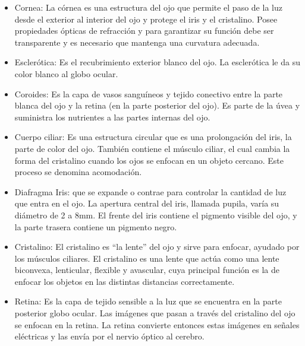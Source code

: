 \begin{itemize}
	\item Cornea: La córnea es una estructura del ojo que permite el paso de la luz
	      desde el exterior al interior del ojo y protege el iris y el cristalino. Posee
	      propiedades ópticas de refracción y para garantizar su función debe ser transparente
	      y es necesario que mantenga una curvatura adecuada.
	\item Esclerótica: Es el recubrimiento exterior blanco del ojo. La esclerótica le da
	      su color blanco al globo ocular.
	\item Coroides: Es la capa de vasos sanguíneos y tejido conectivo entre la parte blanca del ojo y la retina (en la parte posterior del ojo). Es parte de la úvea y suministra los nutrientes a las partes internas del ojo.
	\item Cuerpo ciliar: Es una estructura circular que es una prolongación del iris, la
	      parte de color del ojo. También contiene el músculo ciliar, el cual cambia la forma
	      del cristalino cuando los ojos se enfocan en un objeto cercano. Este proceso se
	      denomina acomodación.
	\item Diafragma Iris: que se expande o contrae para controlar la cantidad de luz que
	      entra en el ojo. La apertura central del iris, llamada pupila, varía su diámetro de 2
	      a 8mm. El frente del iris contiene el pigmento visible del ojo, y la parte trasera
	      contiene un pigmento negro.
	\item Cristalino: El cristalino es “la lente” del ojo y sirve para enfocar, ayudado
	      por los músculos ciliares. El cristalino es una lente que actúa como una lente
	      biconvexa, lenticular, flexible y avascular, cuya principal función es la de enfocar
	      los objetos en las distintas distancias correctamente.
	\item Retina: Es la capa de tejido sensible a la luz que se encuentra en la parte
	      posterior globo ocular. Las imágenes que pasan a través del cristalino del ojo se
	      enfocan en la retina. La retina convierte entonces estas imágenes en señales eléctricas
	      y las envía por el nervio óptico al cerebro.
\end{itemize}
\cite{Book:Jose2005}


